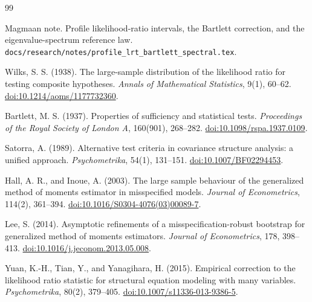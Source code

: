 \documentclass[11pt]{article}
\theoremstyle{plain}
\theoremstyle{remark}
\begin{document}
\begin{thebibliography}{99}

Magmaan note. Profile likelihood-ratio intervals, the Bartlett correction, and
the eigenvalue-spectrum reference law.
\texttt{docs/research/notes/profile\_lrt\_bartlett\_spectral.tex}.

Wilks, S. S. (1938). The large-sample distribution of the likelihood ratio for
testing composite hypotheses. \emph{Annals of Mathematical Statistics}, 9(1),
60--62.
\href{https://doi.org/10.1214/aoms/1177732360}{doi:10.1214/aoms/1177732360}.

Bartlett, M. S. (1937). Properties of sufficiency and statistical tests.
\emph{Proceedings of the Royal Society of London A}, 160(901), 268--282.
\href{https://doi.org/10.1098/rspa.1937.0109}{doi:10.1098/rspa.1937.0109}.

Satorra, A. (1989). Alternative test criteria in covariance structure analysis:
a unified approach. \emph{Psychometrika}, 54(1), 131--151.
\href{https://doi.org/10.1007/BF02294453}{doi:10.1007/BF02294453}.

Hall, A. R., and Inoue, A. (2003). The large sample behaviour of the generalized
method of moments estimator in misspecified models. \emph{Journal of
Econometrics}, 114(2), 361--394.
\href{https://doi.org/10.1016/S0304-4076(03)00089-7}{doi:10.1016/S0304-4076(03)00089-7}.

Lee, S. (2014). Asymptotic refinements of a misspecification-robust bootstrap
for generalized method of moments estimators. \emph{Journal of Econometrics},
178, 398--413.
\href{https://doi.org/10.1016/j.jeconom.2013.05.008}{doi:10.1016/j.jeconom.2013.05.008}.

Yuan, K.-H., Tian, Y., and Yanagihara, H. (2015). Empirical correction to the
likelihood ratio statistic for structural equation modeling with many variables.
\emph{Psychometrika}, 80(2), 379--405.
\href{https://doi.org/10.1007/s11336-013-9386-5}{doi:10.1007/s11336-013-9386-5}.

\end{thebibliography}
\end{document}
